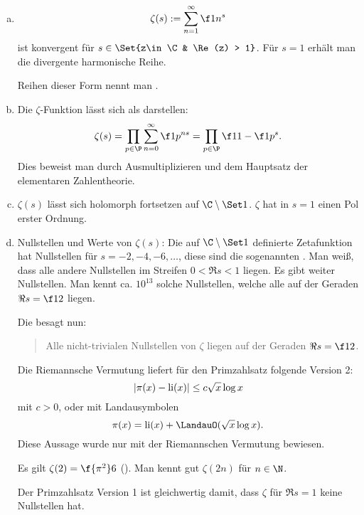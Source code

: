 \begin{nt} \label{7.11}
	\begin{enumerate}[a)]
		\item
			\[
				\zeta(s) := \sum_{n=1}^\infty \f 1{n^s}
			\]
			ist konvergent für $s \in \Set{z\in \C & \Re(z) > 1}$.
			Für $s = 1$ erhält man die divergente harmonische Reihe.

			Reihen dieser Form nennt man .
		\item
			Die $\zeta$-Funktion lässt sich als  darstellen:
			\[
				\zeta(s)
				= \prod_{p\in\P} \sum_{n=0}^\infty \f 1{p^{ns}}
				= \prod_{p\in\P} \f 1{1 - \f 1{p^s}}.
			\]
			Dies beweist man durch Ausmultiplizieren und dem Hauptsatz der elementaren Zahlentheorie.
		\item
			$\zeta(s)$ lässt sich holomorph fortsetzen auf $\C \setminus \Set 1$.
			$\zeta$ hat in $s = 1$ einen Pol erster Ordnung.
		\item
			Nullstellen und Werte von $\zeta(s)$:
			Die auf $\C \setminus \Set 1$ definierte Zetafunktion hat Nullstellen für $s = -2, -4, -6, \dotsc$,
			diese sind die sogenannten .
			Man weiß, dass alle andere Nullstellen im Streifen $0 < \Re s < 1$ liegen.
			Es gibt weiter Nullstellen.
			Man kennt ca. $10^{13}$ solche Nullstellen, welche alle auf der Geraden $\Re s = \f 12$ liegen.

			Die  besagt nun:
			\begin{quote}
				Alle nicht-trivialen Nullstellen von $\zeta$ liegen auf der Geraden $\Re s = \f 12$.
			\end{quote}

			Die Riemannsche Vermutung liefert für den Primzahlsatz folgende Version 2:
			\[
				|\pi(x) - \operatorname{li}(x)|
				\le c \sqrt x \log x
			\]
			mit $c > 0$, oder mit Landausymbolen
			\[
				\pi(x) = \li(x) + \LandauO(\sqrt x \log x).
			\]
			Diese Aussage wurde nur mit der Riemannschen Vermutung bewiesen.

			Es gilt $\zeta(2) = \f{\pi^2}6$ ().
			Man kennt gut $\zeta(2n)$ für $n \in \N$.

			Der Primzahlsatz Version 1 ist gleichwertig damit, dass $\zeta$ für $\Re s = 1$ keine Nullstellen hat.
	\end{enumerate}
\end{nt}


